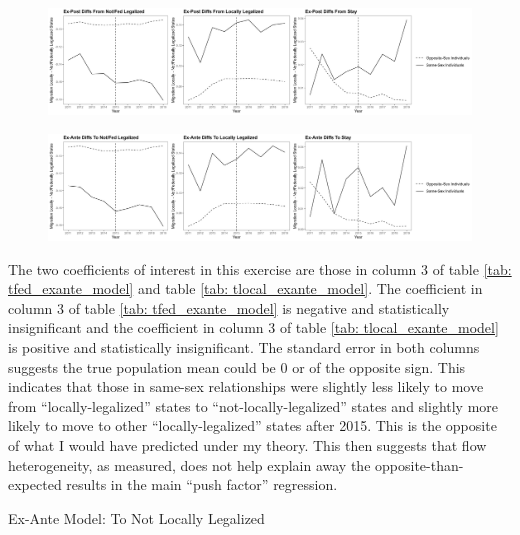 \documentclass[12pt,letterpaper]{article}
\begin{document}
\begin{figure}[h]
    \centering
    \includegraphics[width=1\linewidth]{outputs/summary_stats/flows_post_diffs.png}
    \caption{}
    \label{fig: flows_post_diffs}
\end{figure}
\begin{figure}[h]
    \centering
    \includegraphics[width=1\linewidth]{outputs/summary_stats/flows_ante_diffs.png}
    \caption{}
    \label{fig: flows_ante_diffs}
\end{figure}

 The two coefficients of interest in this exercise are those in column 3  of table \ref{tab: tfed_exante_model} and table \ref{tab: tlocal_exante_model}. The coefficient in column 3 of table \ref{tab: tfed_exante_model} is negative and statistically insignificant and the coefficient in column 3 of table \ref{tab: tlocal_exante_model} is positive and statistically insignificant. The standard error in both columns suggests the true population mean could be 0 or of the opposite sign. This indicates that those in same-sex relationships were slightly less likely to move from “locally-legalized” states to “not-locally-legalized” states and slightly more likely to move to other “locally-legalized” states after 2015. This is the opposite of what I would have predicted under my theory. This then suggests that flow heterogeneity, as measured, does not help explain away the opposite-than-expected results in the main “push factor” regression. 

\begin{table}[p] %
    \centering
    \caption{Ex-Ante Model: To Not Locally Legalized}
    \label{tab: tfed_exante_model}
    
\end{table}
\end{document}
